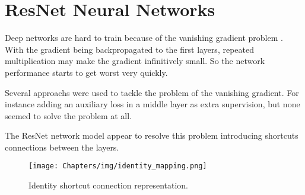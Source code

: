 \iffalse
\begin{itemize}
	\item Step Size $\nabla$ - A first question is how to find the step length $\nabla$. One condition is that $\eta$ should guarantee sufficient decrease in the function value. We will not cover these methods here but the most common ones are Backtracking line search or the Wolf Line Search (1999)
	\item Descent Direction -  A second problem is that using the negative gradient as direction can lead to a very slow converge. Different methods that change the descent direction by multyplying the gradient by a matrix \textbf{B} have been proposed that guarantee a faster convergence. Two notable methods are the Conjugate Gradient and the Limitedd Memory Quasi Newton  methods.
	\item Stopping Criteria - It will normally not be possible to reach full convergence either because it will be too slow, or because of numerical issues (computers cannot perform exact arithmetic). So normally a stopping criteria is defined for the algorithm. Three common criteria, that are normally used together are: a maximum number of iterations; the gradient norm be smaller than a given threshold or the normalized difference in the function value be smaller than a given threshold.
\end{itemize}

Batch Gradient Descent
Stochastic Gradient Descent
Mini-batch Gradient Descent
\fi



\section{ResNet Neural Networks}

Deep networks are hard to train because of the vanishing gradient problem \cite{Glorot10understandingthe}. With the gradient being backpropagated to the first layers, repeated multiplication may make the gradient infinitively small. So the network performance starts to get worst very quickly.

Several approachs were used to tackle the problem of the vanishing gradient. For instance adding an auxiliary loss in a middle layer as extra supervision, but none seemed to solve the problem at all.

The ResNet network model appear to resolve this problem introducing shortcuts connections between the layers.

\begin{figure}[H]
    \centering
    \texttt{[image: Chapters/img/identity\_mapping.png]}
    \caption{Identity shortcut connection representation.}
    \label{fig:learning_diagram}
\end{figure}

